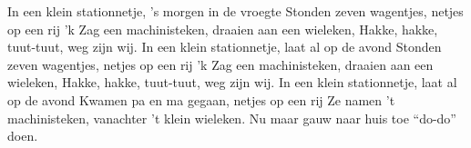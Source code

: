 \beginverse*
In een klein stationnetje, 's morgen in de vroegte
Stonden zeven wagentjes, netjes op een rij
'k Zag een machinisteken, draaien aan een wieleken,
Hakke, hakke, tuut-tuut, weg zijn wij. 
\endverse
\beginverse*
In een klein stationnetje, laat al op de avond
Stonden zeven wagentjes, netjes op een rij
'k Zag een machinisteken, draaien aan een wieleken,
Hakke, hakke, tuut-tuut, weg zijn wij. 
\endverse
\beginverse*
In een klein stationnetje, laat al op de avond
Kwamen pa en ma gegaan, netjes op een rij
Ze namen 't machinisteken, vanachter 't klein wieleken. 
Nu maar gauw naar huis toe “do-do” doen. 
\endverse
\endsong